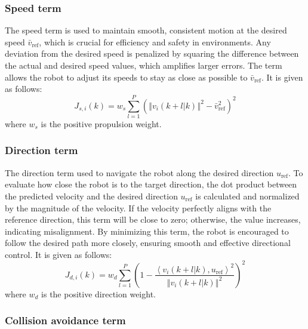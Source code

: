 \subsubsection{Speed term}
The speed term is used to maintain smooth, consistent motion at the desired speed $\bar{v}_\text{ref}$, which is crucial for efficiency and safety in environments. Any deviation from the desired speed is penalized by squaring the difference between the actual and desired speed values, which amplifies larger errors. The term allows the robot to adjust its speeds to stay as close as possible to $\bar{v}_\text{ref}$. It is given as follows:
\begin{equation}
    J_{s,i}(k)=w_s\sum_{l=1}^P\left(\left\Vert v_i(k+l|k)\right\Vert^2-\bar{v}_\text{ref}^2\right)^2
\end{equation}
where $w_s$ is the positive propulsion weight.

\subsubsection{Direction term}
The direction term used to navigate the robot along the desired direction $u_\text{ref}$. To evaluate how close the robot is to the target direction, the dot product between the predicted velocity and the desired direction $u_\text{ref}$ is calculated and normalized by the magnitude of the velocity. If the velocity perfectly aligns with the reference direction, this term will be close to zero; otherwise, the value increases, indicating misalignment. By minimizing this term, the robot is encouraged to follow the desired path more closely, ensuring smooth and effective directional control. It is given as follows:
\begin{equation}
    J_{d,i}(k)=w_d\sum_{l=1}^P{\left(1-\dfrac{\left\langle v_i\left(k+l|k\right),u_\text{ref}\right\rangle^2}{\left\Vert v_i(k+l|k)\right\Vert^2}\right)^2}
\end{equation}
where $w_d$ is the positive direction weight.

\subsubsection{Collision avoidance term}

